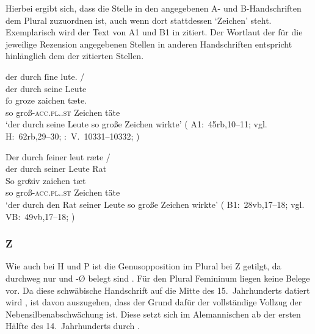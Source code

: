 Hierbei ergibt sich, dass die Stelle in den angegebenen A- und B-Handschriften
dem Plural zuzuordnen ist, auch wenn dort stattdessen  `Zeichen'
steht. Exemplarisch wird der Text von A1 und B1 in 
zitiert. Der Wortlaut der für die jeweilige Rezension angegebenen Stellen in
anderen Handschriften entspricht hinlänglich dem der zitierten Stellen.

\begin{exe}
\ex \label{ex:groziuwunder}
	\begin{xlist}
	\ex \label{ex:groziuwunder_1}
		\gll der durch ſine lute. {/} \\
			der durch seine Leute \\
		\gll ſo groze zaichen tæte. \\
			so groß-\textsc{acc.pl.\NeutI.st} Zeichen täte \\
		\trans `der durch seine Leute so große Zeichen wirkte'
			(%
				A1:~45rb,10--11; vgl.~%
				H:~62rb,29--30;
				\KC:~V.~10331--10332;
				\cite[271]{schroeder1895}%
			)

	\ex \label{ex:groziuwunder_2}
		\gll Der durch ſeiner leut ræte {/} \\
			der durch seiner Leute Rat \\
		\gll So groͤziv zaichen tæt \\
			so groß-\textsc{acc.pl.\NeutI.st} Zeichen täte \\
		\trans `der durch den Rat seiner Leute so große Zeichen wirkte'
			(%
				B1:~28vb,17--18; vgl.~%
				VB:~49vb,17--18;
				\cite[271]{schroeder1895}%
			)
	\end{xlist}
\end{exe}

\subsubsection{Z}
Wie auch bei H und P ist die Genusopposition im Plural bei Z getilgt, da
durchweg nur  und -Ø belegt sind . Für den Plural
Femininum liegen keine Belege vor. Da diese schwäbische
Handschrift auf die Mitte des 15.~Jahrhunderts datiert wird
\autocite[32]{wolf:kckat}, ist davon auszugehen, dass der Grund dafür der
vollständige Vollzug der Nebensilbenabschwächung ist. Diese setzt sich im
Alemannischen ab der ersten Hälfte des 14.~Jahrhunderts durch
\autocites(Schwäbisch wird nicht gesondert
ausgewiesen)[vgl.][267, Abbildung A~69]{ksw2}.


